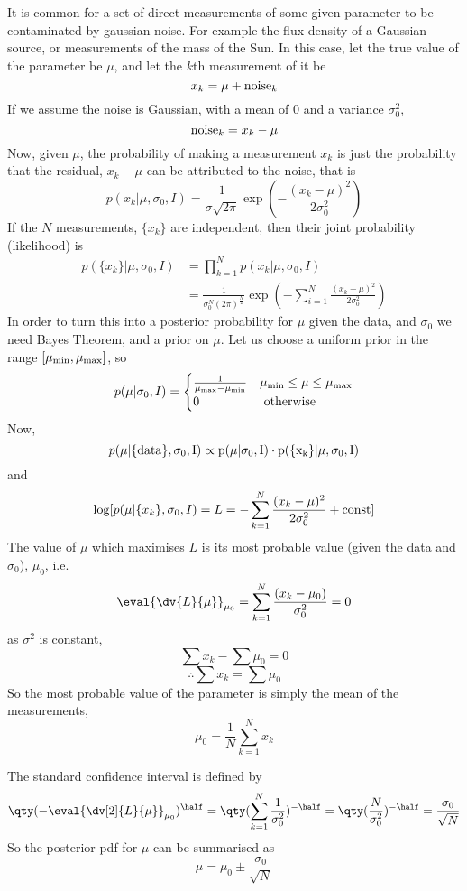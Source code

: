 \documentclass{dwnotes}         		        %
\begin{document}
It is common for a set of direct measurements of some given parameter
to be contaminated by gaussian noise. For example the flux density of
a Gaussian source, or measurements of the mass of the Sun. In this case, let the true value of the parameter be $\mu$, and let the $k$th measurement of it be 
\[ x_k = \mu + {\rm noise}_k \] If we assume the noise is Gaussian,
with a mean of $0$ and a variance $\sigma_0^2$,
\[ {\rm noise}_k = x_k - \mu \]
Now, given $\mu$, the probability of making a measurement $x_k$ is just the probability that the residual, $x_k-\mu$ can be attributed to the noise, that is
\[ p(x_k | \mu, \sigma_0, I) = \frac{1}{\sigma \sqrt{2 \pi}} \exp( -
\frac{(x_k-\mu)^2}{2 \sigma_0^2} )\] If the $N$ measurements, $\{ x_k
\}$ are independent, then their joint probability (likelihood) is
\begin{align*} 
p( \{ x_k \} | \mu, \sigma_0, I ) &= \prod_{k=1}^N p(x_k | \mu, \sigma_0, I) \\
&= \frac{1}{\sigma_0^N (2 \pi)^{\frac{N}{2}}} \exp( - \sum_{i=1}^N \frac{(x_k - \mu)^2}{2 \sigma_0^2} )
\end{align*}
In order to turn this into a posterior probability for $\mu$ given the
data, and $\sigma_0$ we need Bayes Theorem, and a prior on $\mu$. Let
us choose a uniform prior in the range $[\mu_{\rm min}, \mu_{\rm
  max}]$, so
\[ p(\mu|\sigma_0, I) =
\begin{cases}
  \frac{1}{\mu_{\rm max} - \mu_{\rm min}} & \mu_{\rm min} \le \mu \le \mu_{\rm max} \\
0 & \text{ otherwise }
\end{cases}
\]
Now,
\[ p(\mu | \{ \rm data \}, \sigma_0, I) \propto p(\mu | \sigma_0, I) \cdot p( \{ x_k \} | \mu, \sigma_0, I ) \]
and
\[ \log[ p(\mu | \{ x_k \}, \sigma_0, I) = L = - \sum_{k=1}^N \frac{(x_k - \mu)^2}{2 \sigma_0^2} + {\rm const}] \]
The value of $\mu$ which maximises $L$ is its most probable value (given the data and $\sigma_0$), $\mu_0$, i.e.\ 
\[ \eval{ \dv{L}{\mu} }_{\mu_0} = \sum_{k=1}^N \frac{(x_k - \mu_0)}{\sigma_0^2} = 0 \]
as $\sigma^2$ is constant,
\[ \sum x_k - \sum \mu_0 = 0 \]
\[ \therefore \sum x_k = \sum \mu_0 \]
So the most probable value of the parameter is simply the mean of the measurements,
\[ \mu_0 = \frac{1}{N} \sum^N_{k=1} x_k \]

The standard confidence interval is defined by
\[ \qty( - \eval{\dv[2]{L}{\mu}}_{\mu_0} )^{\half} = \qty(
\sum_{k=1}^N \frac{1}{\sigma_0^2})^{- \half} = \qty(
\frac{N}{\sigma_0^2} )^{-\half} = \frac{\sigma_0}{\sqrt{N}} \]
So the posterior pdf for $\mu$ can be summarised as 
\[ \mu = \mu_0 \pm \frac{\sigma_0}{\sqrt{N}} \]
\end{document}
